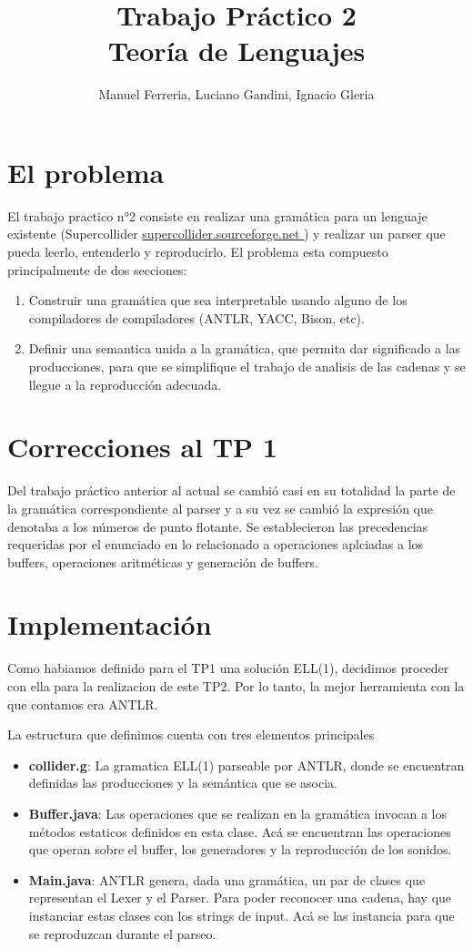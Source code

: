 \documentclass[a4paper]{article}
\title{Trabajo Pr\'actico 2 \\ Teoría de Lenguajes}
\author{Manuel Ferreria, Luciano Gandini, Ignacio Gleria}
\begin{document}
\maketitle


\section{El problema}
El trabajo practico n°2 consiste en realizar una gram\'atica para un lenguaje
existente (Supercollider \url{supercollider.sourceforge.net }) y realizar un parser que pueda leerlo, entenderlo
y reproducirlo. El problema esta compuesto principalmente de dos secciones:
\begin{enumerate}
    \item Construir una gram\'atica que sea interpretable usando alguno de los
        compiladores de compiladores (ANTLR, YACC, Bison, etc).
    \item Definir una semantica unida a la gram\'atica, que permita dar significado
        a las producciones, para que se simplifique el trabajo de analisis de las
        cadenas y se llegue a la reproducci\'on adecuada.
\end{enumerate}

\section{Correcciones al TP 1}
Del trabajo pr\'actico anterior al actual se cambi\'o casi en su totalidad la parte de la gram\'atica correspondiente al parser y a su vez se cambi\'o la expresi\'on que denotaba a los n\'umeros de punto flotante. Se establecieron las precedencias requeridas por el enunciado en lo relacionado a operaciones aplciadas a los buffers, operaciones aritm\'eticas y generaci\'on de buffers.
\section{Implementaci\'on}

Como habiamos definido para el TP1 una soluci\'on ELL(1), decidimos proceder con
ella para la realizacion de este TP2. Por lo tanto, la mejor herramienta con la
que contamos era ANTLR. 

La estructura que definimos cuenta con tres elementos principales
\begin{itemize}
    \item \textbf{collider.g}: La gramatica ELL(1) parseable por ANTLR,
        donde se encuentran definidas las producciones y la sem\'antica
        que se asocia.
    \item \textbf{Buffer.java}: Las operaciones que se realizan en la 
        gram\'atica invocan a los m\'etodos estaticos definidos en esta
        clase. Ac\'a se encuentran las operaciones que operan sobre el 
        buffer, los generadores y la reproducci\'on de los sonidos.
    \item \textbf{Main.java}: ANTLR genera, dada una gram\'atica, un
        par de clases que representan el Lexer y el Parser. Para
        poder reconocer una cadena, hay que instanciar estas clases
        con los strings de input. Ac\'a se las instancia para que se 
        reproduzcan durante el parseo.
\end{itemize}
\end{document}
